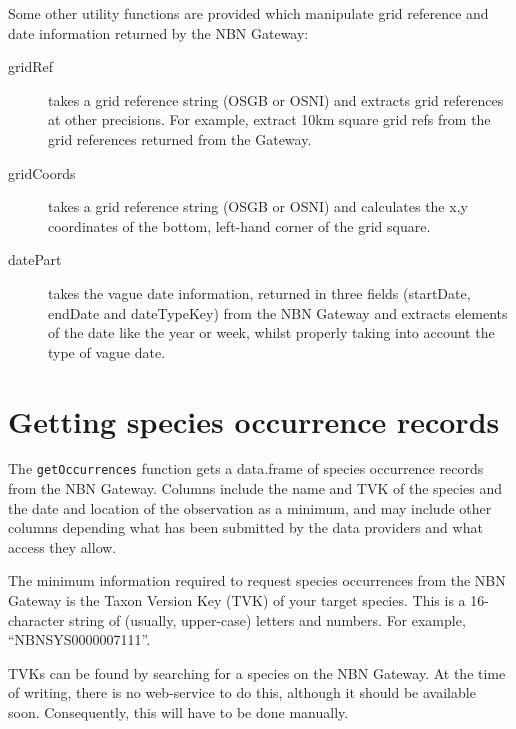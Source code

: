 \documentclass{article}
\begin{document}
Some other utility functions are provided which manipulate grid reference and
date information returned by the NBN Gateway:
\begin{description}
  \item[gridRef] takes a grid reference string (OSGB or OSNI) and extracts grid
  references at other precisions. For example, extract 10km square grid refs
  from the grid references returned from the Gateway.
  \item[gridCoords] takes a grid reference string (OSGB or OSNI) and calculates
  the x,y coordinates of the bottom, left-hand corner of the grid square.
  \item[datePart] takes the vague date information, returned in three fields
  (startDate, endDate and dateTypeKey) from the NBN Gateway and extracts elements
  of the date like the year or week, whilst properly taking into account the
  type of vague date. 
\end{description}

\section{Getting species occurrence records}
The \texttt{getOccurrences} function gets a data.frame of species occurrence records from
the NBN Gateway. Columns include the name and TVK of the species and the date
and location of the observation as a minimum, and may include other columns
depending what has been submitted by the data providers and what access they
allow.

The minimum information required to request species occurrences from the NBN
Gateway is the Taxon Version Key (TVK) of your target species. This is a 
16-character string of (usually, upper-case) letters and numbers. For example,
``NBNSYS0000007111''.

TVKs can be found by searching for a species on the NBN Gateway. At the time of
writing, there is no web-service to do this, although it should be available
soon. Consequently, this will have to be done manually.
\end{document}
